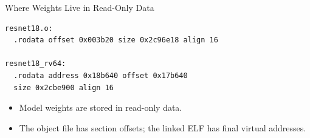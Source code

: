 \documentclass[aspectratio=169,10pt]{beamer}
\begin{document}
\begin{frame}[fragile]{Where Weights Live in Read-Only Data}
  \begin{lstlisting}
resnet18.o:
  .rodata offset 0x003b20 size 0x2c96e18 align 16

resnet18_rv64:
  .rodata address 0x18b640 offset 0x17b640
  size 0x2cbe900 align 16
  \end{lstlisting}
  \begin{itemize}
    \item Model weights are stored in read-only data.
    \item The object file has section offsets; the linked ELF has final virtual addresses.
  \end{itemize}
\end{frame}

\end{document}
